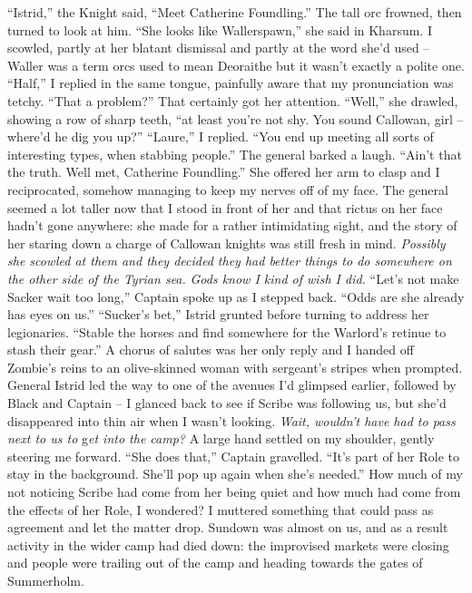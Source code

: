 \documentclass[12pt, openany]{book}
\begin{document}
“Istrid,” the Knight said, “Meet Catherine Foundling.”
The tall orc frowned, then turned to look at him. “She looks like Wallerspawn,” she said in Kharsum.
I scowled, partly at her blatant dismissal and partly at the word she’d used – Waller was a term orcs used to mean Deoraithe but it wasn’t exactly a polite one. “Half,” I replied in the same tongue, painfully aware that my pronunciation was tetchy. “That a problem?”
That certainly got her attention. “Well,” she drawled, showing a row of sharp teeth, “at least you’re not shy. You sound Callowan, girl – where’d he dig you up?”
“Laure,” I replied. “You end up meeting all sorts of interesting types, when stabbing people.”
The general barked a laugh. “Ain’t that the truth. Well met, Catherine Foundling.”
She offered her arm to clasp and I reciprocated, somehow managing to keep my nerves off of my face. The general seemed a lot taller now that I stood in front of her and that rictus on her face hadn’t gone anywhere: she made for a rather intimidating sight, and the story of her staring down a charge of Callowan knights was still fresh in mind. \textit{Possibly she scowled at them and they decided they had better things to do somewhere on the other side of the Tyrian sea.} \textit{Gods know I kind of wish I did.}
“Let’s not make Sacker wait too long,” Captain spoke up as I stepped back. “Odds are she already has eyes on us.”
“Sucker’s bet,” Istrid grunted before turning to address her legionaries. “Stable the horses and find somewhere for the Warlord’s retinue to stash their gear.”
A chorus of salutes was her only reply and I handed off Zombie’s reins to an olive-skinned woman with sergeant’s stripes when prompted. General Istrid led the way to one of the avenues I’d glimpsed earlier, followed by Black and Captain – I glanced back to see if Scribe was following us, but she’d disappeared into thin air when I wasn’t looking. \textit{Wait, wouldn’t have had to pass next to us to} g\textit{et into the camp?} A large hand settled on my shoulder, gently steering me forward. “She does that,” Captain gravelled. “It’s part of her Role to stay in the background. She’ll pop up again when she’s needed.”
How much of my not noticing Scribe had come from her being quiet and how much had come from the effects of her Role, I wondered? I muttered something that could pass as agreement and let the matter drop. Sundown was almost on us, and as a result activity in the wider camp had died down: the improvised markets were closing and people were trailing out of the camp and heading towards the gates of Summerholm.
\end{document}
